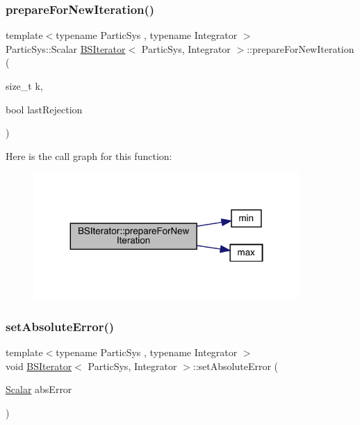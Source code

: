 \mbox{\label{class_b_s_iterator_a738a558ddfacd9959c9438862001d7e8}} 
\subsubsection{\texorpdfstring{prepare\+For\+New\+Iteration()}{prepareForNewIteration()}}
{\footnotesize\ttfamily template$<$typename Partic\+Sys , typename Integrator $>$ \\
Partic\+Sys\+::\+Scalar \mbox{\hyperlink{class_b_s_iterator}{B\+S\+Iterator}}$<$ Partic\+Sys, Integrator $>$\+::prepare\+For\+New\+Iteration (\begin{DoxyParamCaption}\item[{size\+\_\+t}]{k,  }\item[{bool}]{last\+Rejection }\end{DoxyParamCaption})\hspace{0.3cm}{\ttfamily [private]}}

Here is the call graph for this function\+:
\nopagebreak
\begin{figure}[H]
\begin{center}
\leavevmode
\includegraphics[width=287pt]{class_b_s_iterator_a738a558ddfacd9959c9438862001d7e8_cgraph}
\end{center}
\end{figure}
\mbox{\label{class_b_s_iterator_a57603539823be271c2229d0951b7d957}} 
\subsubsection{\texorpdfstring{set\+Absolute\+Error()}{setAbsoluteError()}}
{\footnotesize\ttfamily template$<$typename Partic\+Sys , typename Integrator $>$ \\
void \mbox{\hyperlink{class_b_s_iterator}{B\+S\+Iterator}}$<$ Partic\+Sys, Integrator $>$\+::set\+Absolute\+Error (\begin{DoxyParamCaption}\item[{\mbox{\hyperlink{class_b_s_iterator_a7857f8ff9032955ea4dcc22cd18ca7a1}{Scalar}}}]{abs\+Error }\end{DoxyParamCaption})\hspace{0.3cm}{\ttfamily [inline]}}

